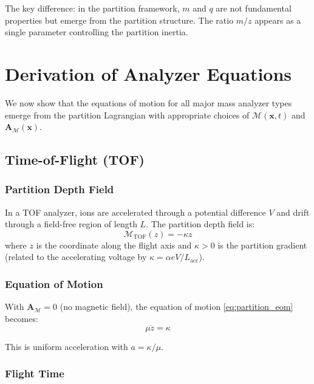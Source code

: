 \documentclass[twocolumn,10pt,a4paper]{article}
\theoremstyle{definition}
\theoremstyle{remark}
\newcommand{\Mdepth}{\mathcal{M}}
\newcommand{\Apartition}{\mathbf{A}_{\mathcal{M}}}
\newcommand{\partinert}{\mu}
\begin{document}
The key difference: in the partition framework, $m$ and $q$ are not fundamental properties but emerge from the partition structure. The ratio $m/z$ appears as a single parameter controlling the partition inertia.

\section{Derivation of Analyzer Equations}
\label{sec:analyzers}

We now show that the equations of motion for all major mass analyzer types emerge from the partition Lagrangian with appropriate choices of $\Mdepth(\mathbf{x}, t)$ and $\Apartition(\mathbf{x})$.

\subsection{Time-of-Flight (TOF)}

\subsubsection{Partition Depth Field}

In a TOF analyzer, ions are accelerated through a potential difference $V$ and drift through a field-free region of length $L$. The partition depth field is:
\begin{equation}
    \Mdepth_{\mathrm{TOF}}(z) = -\kappa z
    \label{eq:tof_field}
\end{equation}
where $z$ is the coordinate along the flight axis and $\kappa > 0$ is the partition gradient (related to the accelerating voltage by $\kappa = \alpha e V / L_{\mathrm{acc}}$).

\subsubsection{Equation of Motion}

With $\Apartition = 0$ (no magnetic field), the equation of motion \eqref{eq:partition_eom} becomes:
\begin{equation}
    \partinert\ddot{z} = \kappa
    \label{eq:tof_eom}
\end{equation}

This is uniform acceleration with $a = \kappa/\partinert$.

\subsubsection{Flight Time}
\end{document}
